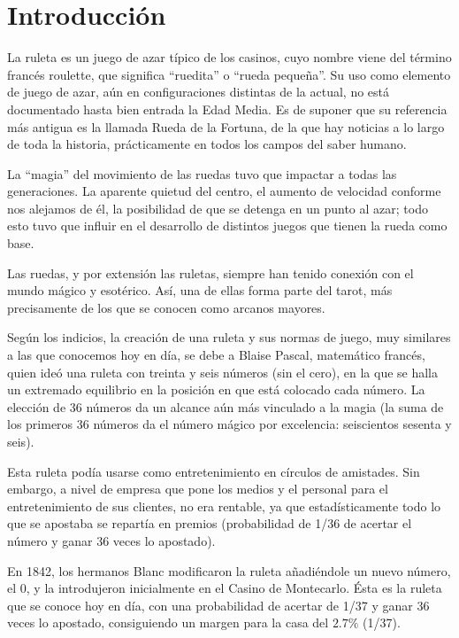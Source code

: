 \section[Introducción]{Introducción \cite{wiki-ruleta}}
La ruleta es un juego de azar típico de los casinos, cuyo nombre viene del término francés roulette, que significa ``ruedita'' o ``rueda pequeña''. Su uso como elemento de juego de azar, aún en configuraciones distintas de la actual, no está documentado hasta bien entrada la Edad Media. Es de suponer que su referencia más antigua es la llamada Rueda de la Fortuna, de la que hay noticias a lo largo de toda la historia, prácticamente en todos los campos del saber humano.

La ``magia'' del movimiento de las ruedas tuvo que impactar a todas las generaciones. La aparente quietud del centro, el aumento de velocidad conforme nos alejamos de él, la posibilidad de que se detenga en un punto al azar; todo esto tuvo que influir en el desarrollo de distintos juegos que tienen la rueda como base.

Las ruedas, y por extensión las ruletas, siempre han tenido conexión con el mundo mágico y esotérico. Así, una de ellas forma parte del tarot, más precisamente de los que se conocen como arcanos mayores.

Según los indicios, la creación de una ruleta y sus normas de juego, muy similares a las que conocemos hoy en día, se debe a Blaise Pascal, matemático francés, quien ideó una ruleta con treinta y seis números (sin el cero), en la que se halla un extremado equilibrio en la posición en que está colocado cada número. La elección de 36 números da un alcance aún más vinculado a la magia (la suma de los primeros 36 números da el número mágico por excelencia: seiscientos sesenta y seis).

Esta ruleta podía usarse como entretenimiento en círculos de amistades. Sin embargo, a nivel de empresa que pone los medios y el personal para el entretenimiento de sus clientes, no era rentable, ya que estadísticamente todo lo que se apostaba se repartía en premios (probabilidad de 1/36 de acertar el número y ganar 36 veces lo apostado).

En 1842, los hermanos Blanc modificaron la ruleta añadiéndole un nuevo número, el 0, y la introdujeron inicialmente en el Casino de Montecarlo. Ésta es la ruleta que se conoce hoy en día, con una probabilidad de acertar de 1/37 y ganar 36 veces lo apostado, consiguiendo un margen para la casa del $2.7\%$ (1/37).

